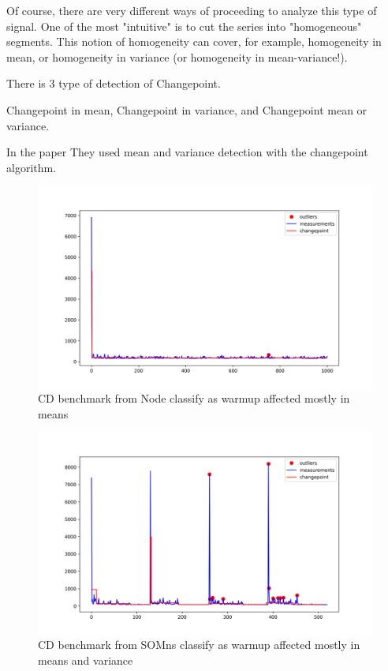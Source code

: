 \documentclass{article}
\begin{document}
Of course, there are very different ways of proceeding to analyze this type of signal. One of the most "intuitive" is to cut the series into "homogeneous" segments. This notion of homogeneity can cover, for example, homogeneity in mean, or homogeneity in variance (or homogeneity in mean-variance!).

There is 3 type of detection of Changepoint.

Changepoint in mean, Changepoint in variance, and Changepoint mean or variance.

In the paper \citep{barrett2017virtual} They used mean and variance detection with the changepoint algorithm.



\begin{figure}[h!]
    \centering
    \includegraphics[width=1\textwidth]{images/plot_6_flat.png}
    \caption{CD benchmark from Node classify as warmup affected mostly in means}
    \label{fig:bench_node_flat}
\end{figure}



\begin{figure}[h!]
    \centering
    \includegraphics[width=1\textwidth]{images/plot_10_flat.png}
    \caption{CD benchmark from SOMns classify as warmup affected mostly in means and variance}
    \label{fig:bench_somns_flat}
\end{figure}
\end{document}
